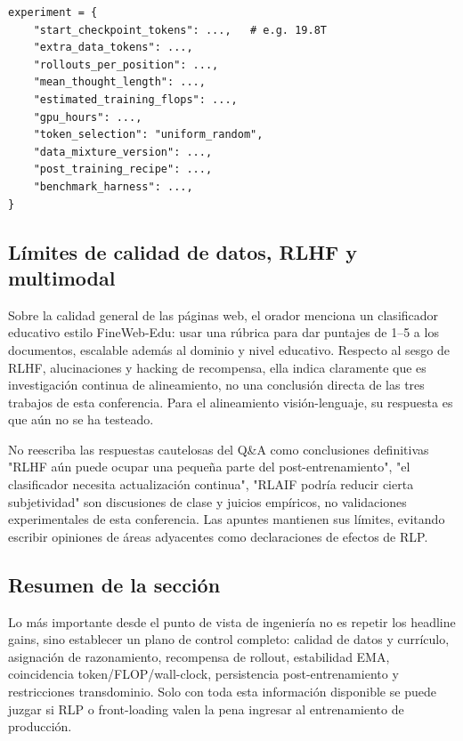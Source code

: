 

\begin{lstlisting}[caption={Tabla mínima de experimento recomendada para evaluar RLP}]
experiment = {
    "start_checkpoint_tokens": ...,   # e.g. 19.8T
    "extra_data_tokens": ...,
    "rollouts_per_position": ...,
    "mean_thought_length": ...,
    "estimated_training_flops": ...,
    "gpu_hours": ...,
    "token_selection": "uniform_random",
    "data_mixture_version": ...,
    "post_training_recipe": ...,
    "benchmark_harness": ...,
}
\end{lstlisting}

\subsection{Límites de calidad de datos, RLHF y multimodal}

Sobre la calidad general de las páginas web, el orador menciona un clasificador educativo estilo FineWeb-Edu: usar una rúbrica para dar puntajes de 1--5 a los documentos, escalable además al dominio y nivel educativo. Respecto al sesgo de RLHF, alucinaciones y hacking de recompensa, ella indica claramente que es investigación continua de alineamiento, no una conclusión directa de las tres trabajos de esta conferencia. Para el alineamiento visión-lenguaje, su respuesta es que aún no se ha testeado.

\begin{warningbox}{No reescriba las respuestas cautelosas del Q\&A como conclusiones definitivas}
"RLHF aún puede ocupar una pequeña parte del post-entrenamiento", "el clasificador necesita actualización continua", "RLAIF podría reducir cierta subjetividad" son discusiones de clase y juicios empíricos, no validaciones experimentales de esta conferencia. Las apuntes mantienen sus límites, evitando escribir opiniones de áreas adyacentes como declaraciones de efectos de RLP.
\end{warningbox}

\subsection{Resumen de la sección}

Lo más importante desde el punto de vista de ingeniería no es repetir los headline gains, sino establecer un plano de control completo: calidad de datos y currículo, asignación de razonamiento, recompensa de rollout, estabilidad EMA, coincidencia token/FLOP/wall-clock, persistencia post-entrenamiento y restricciones transdominio. Solo con toda esta información disponible se puede juzgar si RLP o front-loading valen la pena ingresar al entrenamiento de producción.

